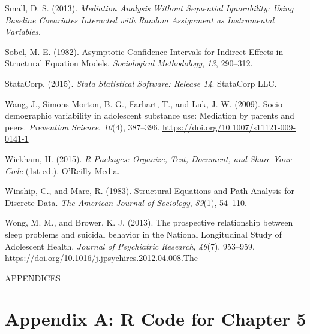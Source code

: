 \documentclass[]{DissertateUSU}
\begin{document}
\hypertarget{ref-Small2013}{}
Small, D. S. (2013). \emph{Mediation Analysis Without Sequential
Ignorability: Using Baseline Covariates Interacted with Random
Assignment as Instrumental Variables}.

\hypertarget{ref-Sobel1982}{}
Sobel, M. E. (1982). Asymptotic Confidence Intervals for Indirect
Effects in Structural Equation Models. \emph{Sociological Methodology},
\emph{13}, 290--312.

\hypertarget{ref-Stata14}{}
StataCorp. (2015). \emph{Stata Statistical Software: Release 14}.
StataCorp LLC.

\hypertarget{ref-Wang2009}{}
Wang, J., Simons-Morton, B. G., Farhart, T., and Luk, J. W. (2009).
Socio-demographic variability in adolescent substance use: Mediation by
parents and peers. \emph{Prevention Science}, \emph{10}(4), 387--396.
\url{https://doi.org/10.1007/s11121-009-0141-1}

\hypertarget{ref-Wickham2015}{}
Wickham, H. (2015). \emph{R Packages: Organize, Test, Document, and
Share Your Code} (1st ed.). O'Reilly Media.

\hypertarget{ref-Winship1983}{}
Winship, C., and Mare, R. (1983). Structural Equations and Path Analysis
for Discrete Data. \emph{The American Journal of Sociology},
\emph{89}(1), 54--110.

\hypertarget{ref-Wong2013}{}
Wong, M. M., and Brower, K. J. (2013). The prospective relationship
between sleep problems and suicidal behavior in the National
Longitudinal Study of Adolescent Health. \emph{Journal of Psychiatric
Research}, \emph{46}(7), 953--959.
\url{https://doi.org/10.1016/j.jpsychires.2012.04.008.The}

\clearpage
{} 
\fancyhead[R]{\thepage} \fancyfoot[C]{}

\vspace*{\fill}

\begin{center}
    APPENDICES 
  \end{center}

\vspace*{\fill}

\clearpage

\doublespacing

\section*{Appendix A: R Code for Chapter
5}\label{appendix-a-r-code-for-chapter-5}
\end{document}
